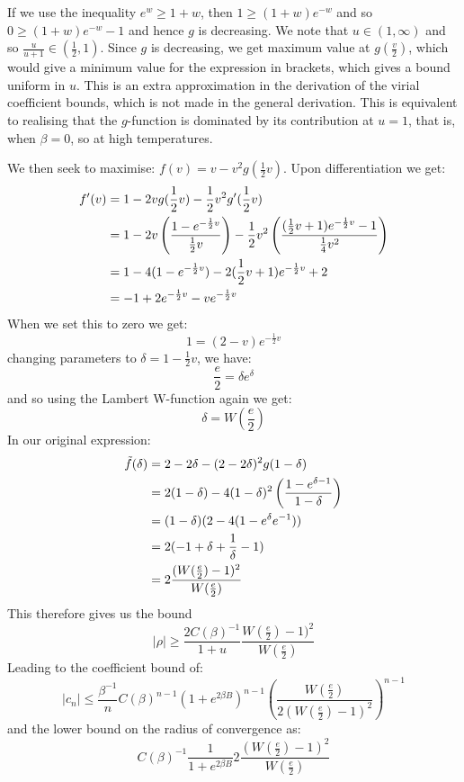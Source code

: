 \documentclass[reqno]{amsart}
\def\be{\begin{equation}}
\def\ee{\end{equation}}
\numberwithin{equation}{section}
\begin{document}
If we use the inequality $e^w \geq 1+w$, then $1 \geq (1+w)e^{-w}$ and so $0 \geq (1+w)e^{-w}-1$ and hence $g$ is decreasing. We note that $u \in (1,\infty)$ and so $\frac{u}{u+1} \in (\frac{1}{2},1)$. Since $g$ is decreasing, we get maximum value at $g(\frac{v}{2})$, which would give a minimum value for the expression in brackets, which gives a bound uniform in $u$. This is an extra approximation in the derivation of the virial coefficient bounds, which is not made in the general derivation. This is equivalent to realising that the $g$-function is dominated by its contribution at $u=1$, that is, when $\beta=0$, so at high temperatures.

We then seek to maximise: $f(v)=v-v^2g(\frac{1}{2}v)$.
Upon differentiation we get:
\begin{align} f'(v) &= 1-2vg(\frac{1}{2}v)-\frac{1}{2}v^2g'(\frac{1}{2}v) \notag \\ &=1-2v\left(\frac{1-e^{-\frac{1}{2}v}}{\frac{1}{2}v}\right) -\frac{1}{2}v^2\left(\frac{(\frac{1}{2}v+1)e^{-\frac{1}{2}v}-1}{\frac{1}{4}v^2}\right) \notag \\ &= 1-4(1-e^{-\frac{1}{2}v})-2(\frac{1}{2}v+1)e^{-\frac{1}{2}v}+2 \notag \\ &=-1+2e^{-\frac{1}{2}v}-ve^{-\frac{1}{2}v} \end{align}
When we set this to zero we get:
\be 1=(2-v)e^{-\frac{1}{2}v} \ee
changing parameters to $\delta=1-\frac{1}{2}v$, we have:
\be \frac{e}{2}=\delta e^{\delta} \ee
and so using the Lambert W-function again we get:
\be \delta=W\left(\frac{e}{2}\right) \ee
In our original expression:
\begin{align} \tilde{f}(\delta)&=2-2\delta-(2-2\delta)^2g(1-\delta) \notag \\ &=2(1 - \delta)-4(1-\delta)^2\left(\frac{1-e^{\delta-1}}{1-\delta}\right) \notag \\ &= (1-\delta)(2-4(1-e^{\delta}e^{-1})) \notag \\ &= 2(-1+\delta+\frac{1}{\delta}-1) \notag \\ &=2\frac{(W(\frac{e}{2})-1)^2}{W(\frac{e}{2})} \end{align}
This therefore gives us the bound 
\be |\rho| \geq \frac{2C(\beta)^{-1}}{1+u}\frac{W(\frac{e}{2})-1)^2}{W(\frac{e}{2})} \ee
Leading to the coefficient bound of:
\be |c_n| \leq \frac{\beta^{-1}}{n}C(\beta)^{n-1}(1+e^{2\beta B})^{n-1}\left(\frac{W(\frac{e}{2})}{2(W(\frac{e}{2})-1)^2}\right)^{n-1} \ee
and the lower bound on the radius of convergence as:
\be C(\beta)^{-1}\frac{1}{1+e^{2\beta B}}2\frac{(W(\frac{e}{2})-1)^2}{W(\frac{e}{2})} \label{LPenradius} \ee
\end{document}
